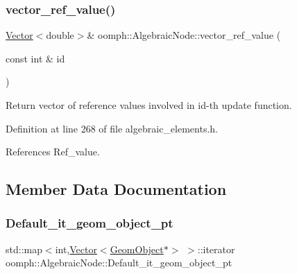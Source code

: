 \mbox{\label{classoomph_1_1AlgebraicNode_a95a41fd3d3aa47a6928715bc7f1059a0}} 
\subsubsection{\texorpdfstring{vector\+\_\+ref\+\_\+value()}{vector\_ref\_value()}\hspace{0.1cm}{\footnotesize\ttfamily [2/2]}}
{\footnotesize\ttfamily \hyperlink{classoomph_1_1Vector}{Vector}$<$double$>$\& oomph\+::\+Algebraic\+Node\+::vector\+\_\+ref\+\_\+value (\begin{DoxyParamCaption}\item[{const int \&}]{id }\end{DoxyParamCaption})\hspace{0.3cm}{\ttfamily [inline]}}



Return vector of reference values involved in id-\/th update function. 



Definition at line 268 of file algebraic\+\_\+elements.\+h.



References Ref\+\_\+value.



\subsection{Member Data Documentation}
\mbox{\label{classoomph_1_1AlgebraicNode_a37df439c4a73665cf04548f245419150}} 
\subsubsection{\texorpdfstring{Default\+\_\+it\+\_\+geom\+\_\+object\+\_\+pt}{Default\_it\_geom\_object\_pt}}
{\footnotesize\ttfamily std\+::map$<$int,\hyperlink{classoomph_1_1Vector}{Vector}$<$\hyperlink{classoomph_1_1GeomObject}{Geom\+Object}$\ast$$>$ $>$\+::iterator oomph\+::\+Algebraic\+Node\+::\+Default\+\_\+it\+\_\+geom\+\_\+object\+\_\+pt\hspace{0.3cm}{\ttfamily [private]}}



